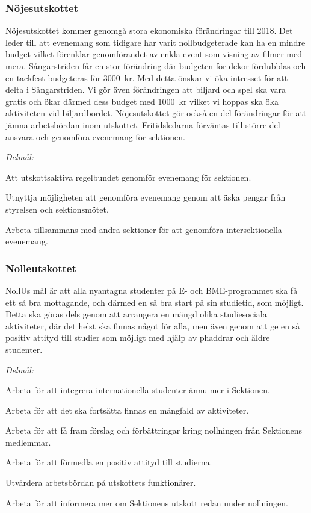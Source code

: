 \documentclass[../_main/handlingar.tex]{subfiles}
\begin{document}
\subsubsection*{Nöjesutskottet}
Nöjesutskottet kommer genomgå stora ekonomiska förändringar till 2018. Det leder till att evenemang som tidigare har varit nollbudgeterade kan ha en mindre budget vilket förenklar genomförandet av enkla event som visning av filmer med mera. Sångarstriden får en stor förändring där budgeten för dekor fördubblas och en tackfest budgeteras för \SI{3000}{kr}. Med detta önskar vi öka intresset för att delta i Sångarstriden. Vi gör även förändringen att biljard och spel ska vara gratis och ökar därmed dess budget med \SI{1000}{kr} vilket vi hoppas ska öka aktiviteten vid biljardbordet. Nöjesutskottet gör också en del förändringar för att jämna arbetsbördan inom utskottet. Fritidsledarna förväntas till större del ansvara och genomföra evenemang för sektionen.

\emph{Delmål:}
\begin{dashlist}
    \item Att utskottsaktiva regelbundet genomför evenemang för sektionen.
    \item Utnyttja möjligheten att genomföra evenemang genom att äska pengar från styrelsen och sektionsmötet.
    \item Arbeta tillsammans med andra sektioner för att genomföra intersektionella evenemang.
\end{dashlist}

\newpage

\subsubsection*{Nolleutskottet}
NollUs mål är att alla nyantagna studenter på E- och BME-programmet ska få ett så bra mottagande, och därmed en så bra start på sin studietid, som möjligt. Detta ska göras dels genom att arrangera en mängd olika studiesociala aktiviteter, där det helst ska finnas något för alla, men även genom att ge en så positiv attityd till studier som möjligt med hjälp av phaddrar och äldre studenter.

\emph{Delmål:}
\begin{dashlist}
    \item Arbeta för att integrera internationella studenter ännu mer i Sektionen.
    \item Arbeta för att det ska fortsätta finnas en mångfald av aktiviteter.
    \item Arbeta för att få fram förslag och förbättringar kring nollningen från Sektionens medlemmar.
    \item Arbeta för att förmedla en positiv attityd till studierna.
    \item Utvärdera arbetsbördan på utskottets funktionärer.
    \item Arbeta för att informera mer om Sektionens utskott redan under nollningen.
\end{dashlist}
\end{document}
